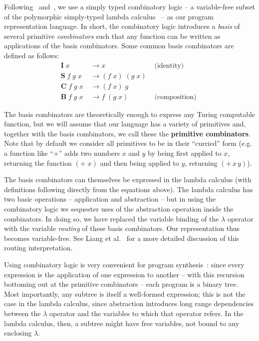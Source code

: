 \documentclass{article}
\begin{document}
Following~\cite{liang10programs} and~\cite{briggs2006functional}, we use a
simply typed combinatory logic -- a variable-free subset of the
polymorphic simply-typed lambda calculus~\cite{Pierce_2002} -- as our
program representation language. In short, the combinatory logic
introduces a \emph{basis} of several primitive \emph{combinators} such
that any function can be written as applications of the basis
combinators. Some common basis combinators are defined as follows:
\begin{align}
\mathbf{I}\; x &\rightarrow  x & \text{ (identity) }\\
\mathbf{S}\; f\; g\; x\; &\rightarrow (f\; x)\; (g\; x)\\ 
\mathbf{C}\; f\; g\; x\; &\rightarrow (f\; x)\; g  \\ 
\mathbf{B}\; f\; g\; x\; &\rightarrow f\; (g\; x) & \text{ (composition) }
\end{align}

The basis combinators are theoretically enough to express any Turing
computable function, but we will assume that our language has a
variety of primitives and, together with the basis combinators, we
call these the \textbf{primitive combinators}. Note that by default we consider
all primitives to be in their ``curried'' form (e.g. a function like
``+'' adds two numbers $x$ and $y$ by being first applied to $x$,
returning the function $(+\;x)$ and then being applied to $y$,
returning $(+\,x\,y)$\;).

The basis combinators can themselves be expressed in the lambda
calculus (with definitions following directly from the equations
above). The lambda calculus has two basic operations -- application
and abstraction -- but in using the
combinatory logic we sequester uses of the abstraction operation
inside the combinators. In doing so, we have replaced the variable
binding of the $\lambda$ operator with the variable \emph{routing} of
these basis combinators. Our representation thus becomes
variable-free. See Liang et al.~\cite{liang10programs} for a more
detailed discussion of this routing interpretation.

Using combinatory logic is very convenient for program
synthesis~\cite{briggs2006functional}: since every expression is the
application of one expression to another -- with this recursion
bottoming out at the primitive combinators -- each program is a binary
tree. Most importantly, any subtree is itself a well-formed
expression; this is not the case in the lambda calculus, since
abstraction introduces long range dependencies between the $\lambda$
operator and the variables to which that operator refers. In the
lambda calculus, then, a subtree might have free variables, not bound
to any enclosing $\lambda$.
\end{document}
